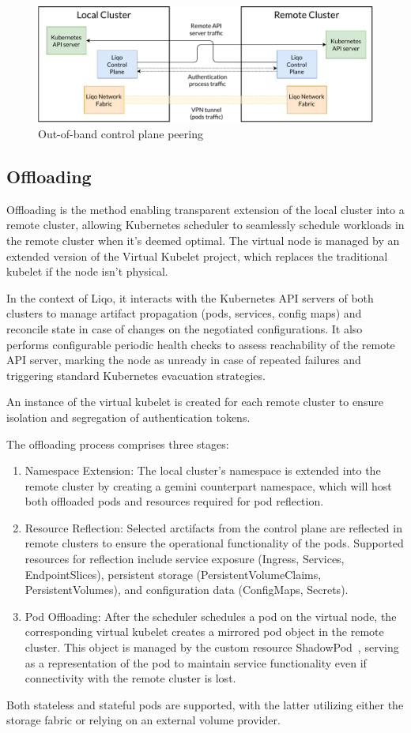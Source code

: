 \begin{figure}[ht]\centering
\includegraphics[scale=.5] {Pictures/out-of-band}
\caption{Out-of-band control plane peering}\label{fig:out-band}
\end{figure}

\subsection{Offloading}
Offloading is the method enabling transparent extension of the local cluster into a remote cluster, allowing Kubernetes scheduler to seamlessly schedule workloads in the remote cluster when it's deemed optimal. The virtual node is managed by an extended version of the Virtual Kubelet project, which replaces the traditional kubelet if the node isn't physical. 

In the context of Liqo, it interacts with the Kubernetes API servers of both clusters to manage artifact propagation (pods, services, config maps) and reconcile state in case of changes on the negotiated configurations. It also performs configurable periodic health checks to assess reachability of the remote API server, marking the node as unready in case of repeated failures and triggering standard Kubernetes evacuation strategies. 

An instance of the virtual kubelet is created for each remote cluster to ensure isolation and segregation of authentication tokens.

The offloading process comprises three stages:
\begin{enumerate}
\item Namespace Extension: The local cluster's namespace is extended into the remote cluster by creating a gemini counterpart namespace, which will host both offloaded pods and resources required for pod reflection.
\item Resource Reflection: Selected arctifacts from the control plane are reflected in remote clusters to ensure the operational functionality of the pods. Supported resources for reflection include service exposure (Ingress, Services, EndpointSlices), persistent storage (PersistentVolumeClaims, PersistentVolumes), and configuration data (ConfigMaps, Secrets).
\item Pod Offloading: After the scheduler schedules a pod on the virtual node, the corresponding virtual kubelet creates a mirrored pod object in the remote cluster. This object is managed by the custom resource ShadowPod~\cite{l1-2}, serving as a representation of the pod to maintain service functionality even if connectivity with the remote cluster is lost.
\end{enumerate}
Both stateless and stateful pods are supported, with the latter utilizing either the storage fabric or relying on an external volume provider.

